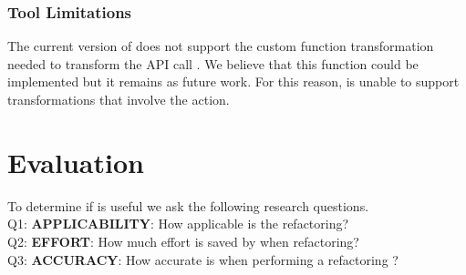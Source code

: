 \documentclass{sigplanconf}
\begin{document}
\subsubsection{Tool Limitations}
The current version of \tool does not support the custom function transformation needed to transform the API call .  We believe that this function could be implemented but it remains as future work.  For this reason,  \tool is unable to support transformations that involve the  action.

%
%
%


\section{Evaluation}
\label{sec:evaluation}
To determine if \tool is useful we ask the following research questions.\\
Q1:  \textbf{APPLICABILITY}:  How applicable is the refactoring?\\
Q2:  \textbf{EFFORT}: How much effort is saved by \tool when refactoring?\\
Q3:  \textbf{ACCURACY}: How accurate is \tool when performing a refactoring ?\\
 
\end{document}
